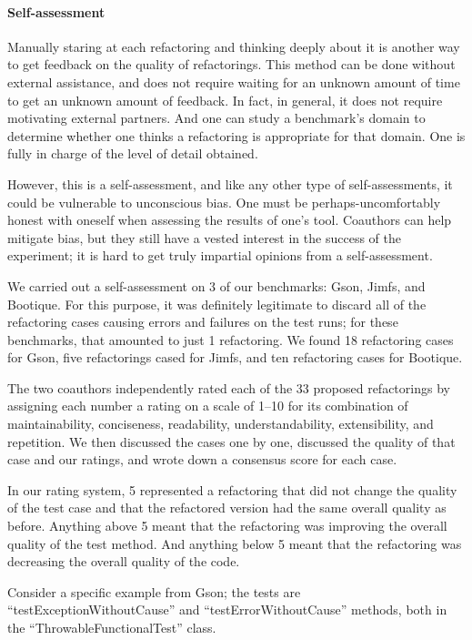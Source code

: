 \paragraph{Self-assessment}
Manually staring at each refactoring and thinking deeply about it is another way to get feedback on the quality of refactorings. This method can be done without external assistance, and does not require waiting for an unknown amount of time to get an unknown amount of feedback. In fact, in general, it does not require motivating external partners. And one can study a benchmark's domain to determine whether one thinks a refactoring is appropriate for that domain. One is fully in charge of the level of detail obtained.

However, this is a self-assessment, and like any other type of self-assessments, it could be vulnerable to unconscious bias. One must be perhaps-uncomfortably honest with oneself when assessing the results of one's tool. Coauthors can help mitigate bias, but they still have a vested interest in the success of the experiment; it is hard to get truly impartial opinions from a self-assessment.

We carried out a self-assessment on 3 of our benchmarks: Gson, Jimfs, and Bootique. For this purpose, it was definitely legitimate to discard all of the refactoring cases causing errors and failures on the test runs; for these benchmarks, that amounted to just 1 refactoring. We found 18 refactoring cases for Gson, five refactorings cased for Jimfs, and ten refactoring cases for Bootique.

The two coauthors independently rated each of the 33 proposed refactorings by assigning each number a rating on a scale of 1--10 for its combination of maintainability, conciseness, readability, understandability, extensibility, and repetition. We then discussed the cases one by one, discussed the quality of that case and our ratings, and wrote down a consensus score for each case.

In our rating system, 5 represented a refactoring that did not change the quality of the test case and that the refactored version had the same overall quality as before. Anything above 5 meant that the refactoring was improving the overall quality of the test method. And anything below 5 meant that the refactoring was decreasing the overall quality of the code.

Consider a specific example from Gson; the tests are ``testExceptionWithoutCause'' and ``testErrorWithoutCause'' methods, both in the ``ThrowableFunctionalTest'' class.

